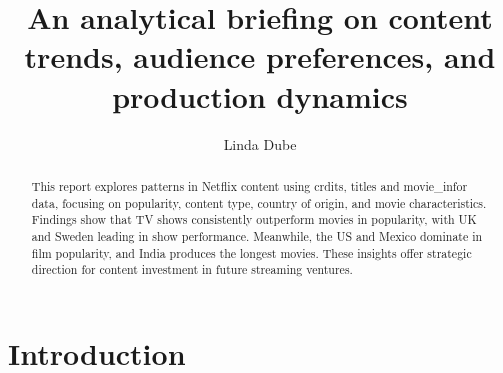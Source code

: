\documentclass[11pt,preprint]{elsarticle}
\numberwithin{equation}{section}
\numberwithin{figure}{section}
\numberwithin{table}{section}
\begin{document}
\begin{frontmatter}  %

\title{An analytical briefing on content trends, audience preferences,
and production dynamics}





\author[Add1]{Linda Dube}





\address[Add1]{Stellenbosch University, Western Cape}


\begin{abstract}
\small{
This report explores patterns in Netflix content using crdits, titles
and movie\_infor data, focusing on popularity, content type, country of
origin, and movie characteristics. Findings show that TV shows
consistently outperform movies in popularity, with UK and Sweden leading
in show performance. Meanwhile, the US and Mexico dominate in film
popularity, and India produces the longest movies. These insights offer
strategic direction for content investment in future streaming ventures.
}
\end{abstract}

\vspace{1cm}





\vspace{0.5cm}

\end{frontmatter}

\setcounter{footnote}{0}



\pagestyle{fancy}
\chead{}
\rhead{}
\lfoot{}
\lhead{}
\cfoot{}


\headsep 35pt %




\section{\texorpdfstring{Introduction
\label{Introduction}}{Introduction }}\label{introduction}
\end{document}
